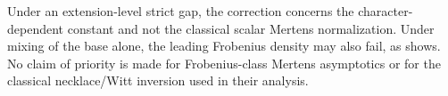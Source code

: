 \begin{remark}
Under an extension-level strict gap, the correction concerns the
character-dependent constant and not the classical scalar Mertens
normalization.  Under mixing of the base alone, the leading Frobenius density
may also fail, as  shows.  No claim
of priority is made for Frobenius-class Mertens asymptotics or for the
classical necklace/Witt inversion used in their analysis.
\end{remark}
